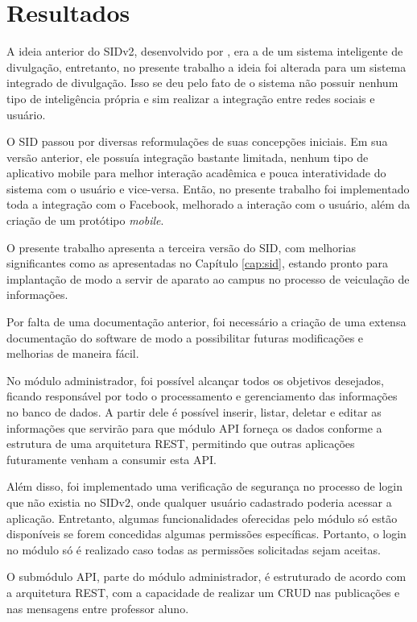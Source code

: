 \chapter[Resultados]{Resultados}
A ideia anterior do SIDv2, desenvolvido por \cite{sobrinho2017}, era a de um sistema inteligente de divulgação, entretanto, no presente trabalho a ideia foi alterada para um sistema integrado de divulgação. Isso se deu pelo fato de o sistema não possuir nenhum tipo de inteligência própria e sim realizar a integração entre redes sociais e usuário.

O SID passou por diversas reformulações de suas concepções iniciais. Em sua versão anterior, ele possuía integração bastante limitada, nenhum tipo de aplicativo mobile para melhor interação acadêmica e pouca interatividade do sistema com o usuário e vice-versa. Então, no presente trabalho foi implementado toda a integração com o Facebook, melhorado a interação com o usuário, além da criação de um protótipo \textit{mobile}.

O presente trabalho apresenta a terceira versão do SID, com melhorias significantes como as apresentadas no Capítulo \ref{cap:sid}, estando pronto para implantação de modo a servir de aparato ao campus no processo de veiculação de informações.

Por falta de uma documentação anterior, foi necessário a criação de uma extensa documentação do software de modo a possibilitar futuras modificações e melhorias de maneira fácil.

No módulo administrador, foi possível alcançar todos os objetivos desejados, ficando responsável por todo o processamento e gerenciamento das informações no banco de dados. A partir dele é possível inserir, listar, deletar e editar as informações que servirão para que módulo API forneça os dados conforme a estrutura de uma arquitetura REST, permitindo que outras aplicações futuramente venham a consumir esta API.

Além disso, foi implementado uma verificação de segurança no processo de login que não existia no SIDv2, onde qualquer usuário cadastrado poderia acessar a aplicação. Entretanto, algumas funcionalidades oferecidas pelo módulo só estão disponíveis se forem concedidas algumas permissões específicas. Portanto, o login no módulo só é realizado caso todas as permissões solicitadas sejam aceitas.

O submódulo API, parte do módulo administrador, é estruturado de acordo com a arquitetura REST, com a capacidade de realizar um CRUD nas publicações e nas mensagens entre professor aluno.

